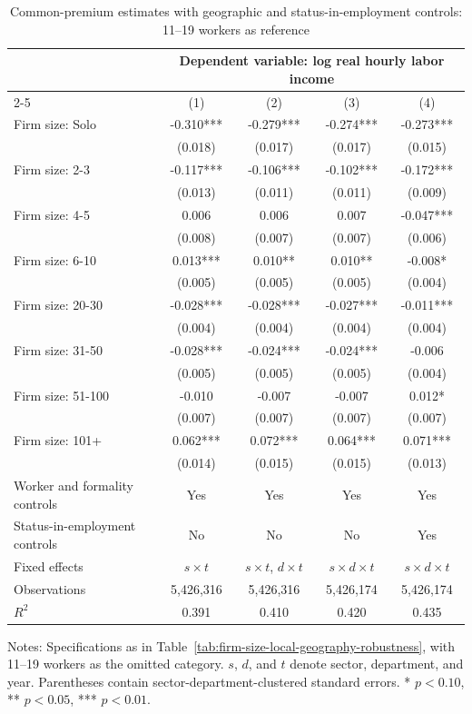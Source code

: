 \begin{table}[htbp]
  \centering
  \caption{Common-premium estimates with geographic and status-in-employment controls: 11--19 workers as reference}
  \label{tab:firm-size-local-geography-robustness-11-19-reference}
  \small
  \begin{tabular}{lcccc}
    \toprule
    & \multicolumn{4}{c}{Dependent variable: log real hourly labor income} \\
    \cmidrule(lr){2-5}
    & (1) & (2) & (3) & (4) \\
    \midrule
    Firm size: Solo & -0.310*** & -0.279*** & -0.274*** & -0.273*** \\
     & (0.018) & (0.017) & (0.017) & (0.015) \\
    Firm size: 2-3 & -0.117*** & -0.106*** & -0.102*** & -0.172*** \\
     & (0.013) & (0.011) & (0.011) & (0.009) \\
    Firm size: 4-5 & 0.006 & 0.006 & 0.007 & -0.047*** \\
     & (0.008) & (0.007) & (0.007) & (0.006) \\
    Firm size: 6-10 & 0.013*** & 0.010** & 0.010** & -0.008* \\
     & (0.005) & (0.005) & (0.005) & (0.004) \\
    Firm size: 20-30 & -0.028*** & -0.028*** & -0.027*** & -0.011*** \\
     & (0.004) & (0.004) & (0.004) & (0.004) \\
    Firm size: 31-50 & -0.028*** & -0.024*** & -0.024*** & -0.006 \\
     & (0.005) & (0.005) & (0.005) & (0.004) \\
    Firm size: 51-100 & -0.010 & -0.007 & -0.007 & 0.012* \\
     & (0.007) & (0.007) & (0.007) & (0.007) \\
    Firm size: 101+ & 0.062*** & 0.072*** & 0.064*** & 0.071*** \\
     & (0.014) & (0.015) & (0.015) & (0.013) \\
    \midrule
    Worker and formality controls & Yes & Yes & Yes & Yes \\
    Status-in-employment controls & No & No & No & Yes \\
    Fixed effects & $s\times t$ & $s\times t$, $d\times t$ & $s\times d\times t$ & $s\times d\times t$ \\
    Observations & 5,426,316 & 5,426,316 & 5,426,174 & 5,426,174 \\
    $R^2$ & 0.391 & 0.410 & 0.420 & 0.435 \\
    \bottomrule
  \end{tabular}
  \vspace{0.3em}
  \begin{minipage}{0.95\textwidth}
  \footnotesize
  Notes: Specifications as in Table~\ref{tab:firm-size-local-geography-robustness}, with 11--19 workers as the omitted category. $s$, $d$, and $t$ denote sector, department, and year. Parentheses contain sector-department-clustered standard errors. * $p<0.10$, ** $p<0.05$, *** $p<0.01$.
  \end{minipage}
\end{table}
